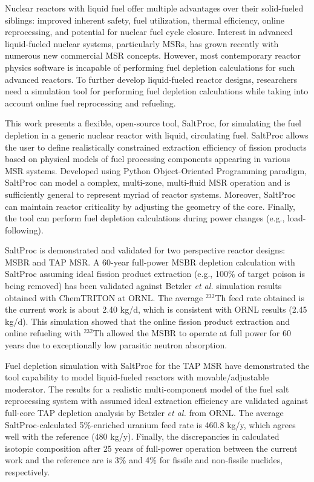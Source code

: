 Nuclear reactors with liquid fuel offer multiple advantages over their 
solid-fueled siblings: improved inherent safety, fuel utilization, thermal
efficiency, online reprocessing, and potential for nuclear fuel cycle closure. 
Interest in advanced liquid-fueled nuclear systems, particularly \glspl{MSR}, 
has grown recently with numerous new commercial \gls{MSR} concepts. However, 
most contemporary reactor physics software is incapable of performing fuel 
depletion calculations for such advanced reactors. To further develop 
liquid-fueled reactor designs, researchers need a simulation tool for 
performing fuel depletion calculations while taking into account online fuel 
reprocessing and refueling. 

This work presents a flexible, open-source tool, SaltProc, for simulating the 
fuel depletion in a generic nuclear reactor with liquid, circulating fuel.
SaltProc allows the user to define realistically constrained extraction 
efficiency of fission products based on physical models of fuel processing 
components appearing in various \gls{MSR} systems.  Developed using Python 
Object-Oriented Programming paradigm, SaltProc can model a complex, 
multi-zone, multi-fluid \gls{MSR} operation and is sufficiently general to 
represent myriad of reactor systems. Moreover, SaltProc can maintain reactor 
criticality by adjusting the geometry of the core.  Finally, the tool can 
perform fuel depletion calculations during power changes (e.g., 
load-following).

SaltProc is demonstrated and validated for two perspective reactor designs: 
\gls{MSBR} and \gls{TAP} \gls{MSR}. A 60-year full-power \gls{MSBR} depletion 
calculation with SaltProc assuming ideal fission product extraction (e.g., 
100\% of target poison is being removed) has been validated against Betzler 
\emph{et al.} simulation results obtained with ChemTRITON at ORNL. The average 
$^{232}$Th feed rate obtained is the current work is about 2.40 kg/d, which is 
consistent with ORNL results (2.45 kg/d). This simulation showed that the 
online fission product extraction and online refueling with $^{232}$Th allowed 
the \gls{MSBR} to operate at full power for 60 years due to exceptionally low 
parasitic neutron absorption.

Fuel depletion simulation with SaltProc for the \gls{TAP} \gls{MSR} have 
demonstrated the tool capability to model liquid-fueled reactors with 
movable/adjustable moderator. The results for a realistic multi-component 
model of the fuel salt reprocessing system with assumed ideal extraction 
efficiency are validated against full-core \gls{TAP} depletion analysis by 
Betzler \emph{et al.} from ORNL. The average SaltProc-calculated 5\%-enriched 
uranium feed rate is 460.8 kg/y, which agrees well with the reference (480 
kg/y). Finally, the discrepancies in calculated isotopic composition after 25 
years of full-power operation between the current work and the reference are 
is 3\% and 4\% for fissile and non-fissile nuclides, respectively.

